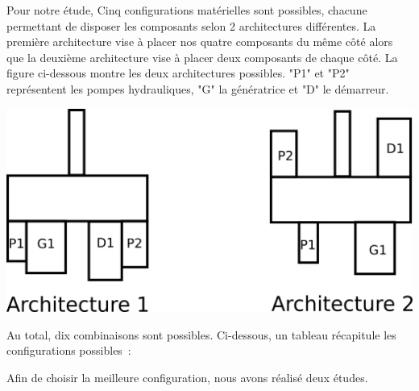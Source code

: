 \documentclass{config}
\begin{document}
\begin{spacing}{1.2}
Pour notre étude, Cinq configurations matérielles sont possibles, chacune permettant de disposer les composants selon 2 architectures différentes. La première architecture vise à placer nos quatre composants du même côté alors que la deuxième architecture vise à placer deux composants de chaque côté.
La figure ci-dessous montre les deux architectures possibles. "P1" et "P2" représentent les pompes hydrauliques, "G" la génératrice et "D" le démarreur. 

\begin{center}
\includegraphics[scale=0.4]{architecture_BE.png}
\end{center}

Au total, dix combinaisons sont possibles. Ci-dessous, un tableau récapitule les configurations possibles :

\begin{table}[h]
\centering
{}
\end{table}

Afin de choisir la meilleure configuration, nous avons réalisé deux études. 


\end{spacing}
\end{document}
